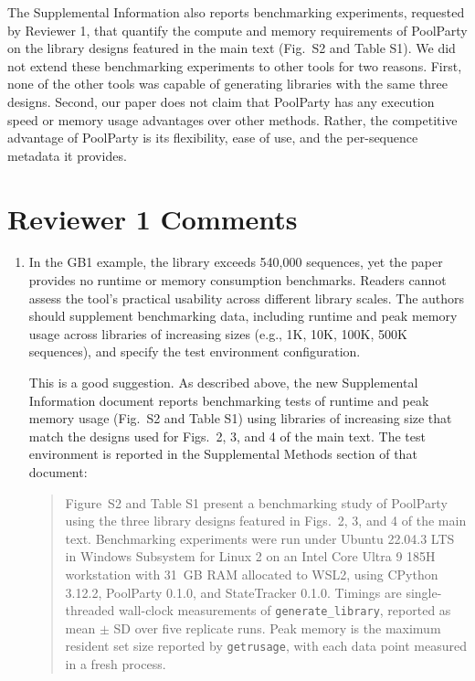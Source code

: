 \documentclass[11pt]{article}
\newenvironment{response}{\par\color{responseblue}}{\par}
\newenvironment{msquote}
  {\begin{quote}\color{quotedtext}\noindent\ignorespaces}
  {\end{quote}}
\newcommand{\responseheading}[1]{%
  \phantomsection
  \addcontentsline{toc}{section}{#1}%
  \section*{#1}}
\begin{document}
\begin{response}
  The Supplemental Information also reports benchmarking experiments, requested by Reviewer 1, that quantify the compute and memory requirements of PoolParty on the library designs featured in the main text (Fig.~S2 and Table S1). We did not extend these benchmarking experiments to other tools for two reasons. First, none of the other tools was capable of generating libraries with the same three designs. Second, our paper does not claim that PoolParty has any execution speed or memory usage advantages over other methods. Rather, the competitive advantage of PoolParty is its flexibility, ease of use, and the per-sequence metadata it provides. 
\end{response}

\responseheading{Reviewer 1 Comments}

\begin{enumerate}
\item In the GB1 example, the library exceeds 540,000 sequences, yet the paper
provides no runtime or memory consumption benchmarks. Readers cannot assess the
tool's practical usability across different library scales. The authors should
supplement benchmarking data, including runtime and peak memory usage across
libraries of increasing sizes (e.g., 1K, 10K, 100K, 500K sequences), and specify
the test environment configuration.

\begin{response}
This is a good suggestion. As described above, the new Supplemental Information document reports benchmarking tests of runtime and peak memory usage (Fig.~S2 and Table S1) using libraries of increasing size that match the designs used for Figs.~2, 3, and 4 of the main text. The test environment is reported in the Supplemental Methods section of that document: 
  \begin{msquote}
    Figure~S2 and Table S1 present a benchmarking study of PoolParty using the three library designs featured in Figs.~2, 3, and 4 of the main text. Benchmarking experiments were run under Ubuntu 22.04.3 LTS in Windows Subsystem for Linux 2 on an Intel Core Ultra 9 185H workstation with 31~GB RAM allocated to WSL2, using CPython 3.12.2, PoolParty 0.1.0, and StateTracker 0.1.0. Timings are single-threaded wall-clock measurements of \texttt{generate\_library}, reported as mean $\pm$ SD over five replicate runs. Peak memory is the maximum resident set size reported by \texttt{getrusage}, with each data point measured in a fresh process.
  \end{msquote}
\end{response}


\end{enumerate}
\end{document}
